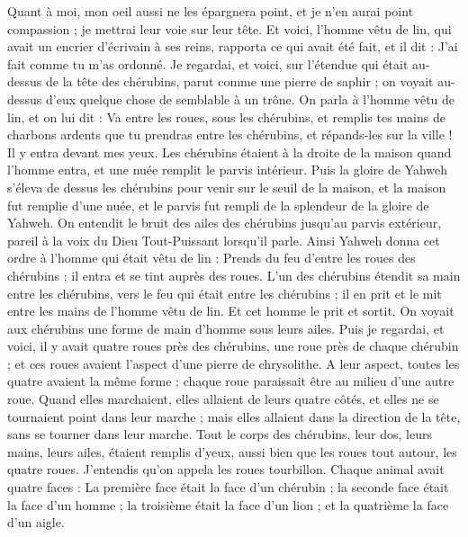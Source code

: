 \begin{multicols}{2}
Quant à moi, mon oeil aussi ne les épargnera point, et je n'en aurai point compassion ; je mettrai leur voie sur leur tête.
Et voici, l'homme vêtu de lin, qui avait un encrier d'écrivain à ses reins, rapporta ce qui avait été fait, et il dit : J'ai fait comme tu m'as ordonné.
\VerseOne{}Je regardai, et voici, sur l'étendue qui était au-dessus de la tête des chérubins, parut comme une pierre de saphir ; on voyait au-dessus d'eux quelque chose de semblable à un trône.
On parla à l'homme vêtu de lin, et on lui dit : Va entre les roues, sous les chérubins, et remplis tes mains de charbons ardents que tu prendras entre les chérubins, et répands-les sur la ville ! Il y entra devant mes yeux.
Les chérubins étaient à la droite de la maison quand l'homme entra, et une nuée remplit le parvis intérieur.
Puis la gloire de Yahweh s'éleva de dessus les chérubins pour venir sur le seuil de la maison, et la maison fut remplie d'une nuée, et le parvis fut rempli de la splendeur de la gloire de Yahweh.
On entendit le bruit des ailes des chérubins jusqu'au parvis extérieur, pareil à la voix du Dieu Tout-Puissant lorsqu'il parle.
Ainsi Yahweh donna cet ordre à l'homme qui était vêtu de lin : Prends du feu d'entre les roues des chérubins ; il entra et se tint auprès des roues.
L'un des chérubins étendit sa main entre les chérubins, vers le feu qui était entre les chérubins ; il en prit et le mit entre les mains de l'homme vêtu de lin. Et cet homme le prit et sortit.
On voyait aux chérubins une forme de main d'homme sous leurs ailes.
Puis je regardai, et voici, il y avait quatre roues près des chérubins, une roue près de chaque chérubin ; et ces roues avaient l'aspect d'une pierre de chrysolithe.
A leur aspect, toutes les quatre avaient la même forme ; chaque roue paraissait être au milieu d'une autre roue.
Quand elles marchaient, elles allaient de leurs quatre côtés, et elles ne se tournaient point dans leur marche ; mais elles allaient dans la direction de la tête, sans se tourner dans leur marche.
Tout le corps des chérubins, leur dos, leurs mains, leurs ailes, étaient remplis d'yeux, aussi bien que les roues tout autour, les quatre roues.
J'entendis qu'on appela les roues tourbillon.
Chaque animal avait quatre faces : La première face était la face d'un chérubin ; la seconde face était la face d'un homme ; la troisième était la face d'un lion ; et la quatrième la face d'un aigle.

\end{multicols}
